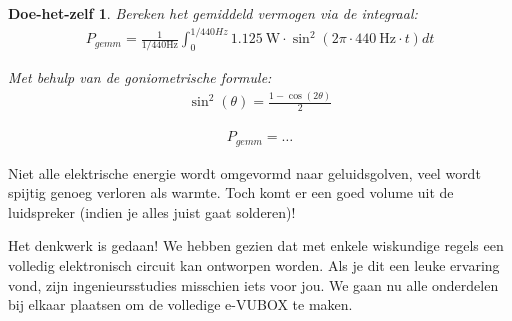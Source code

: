 \documentclass{article}
\newtheorem{DIY}{Doe-het-zelf}
\begin{document}
			\begin{DIY}
				Bereken het gemiddeld vermogen via de integraal:
				\begin{align*}
				   P_{gemm} = \frac{1}{1/440 \text{Hz}} \int_0^{1/440Hz} 1.125~\text{W} \cdot \sin^2 \left(2\pi \cdot 440~\text{Hz} \cdot t\right) dt
				\end{align*}

				Met behulp van de goniometrische formule:
				\begin{align*}
				    \sin^2(\theta) = \frac{1 - \cos(2\theta)}{2}
				 \end{align*}

				 	\begin{align*}
				 	    P_{gemm} = \ldots
				 	\end{align*}
			\end{DIY}

			Niet alle elektrische energie  wordt omgevormd naar geluidsgolven, veel wordt spijtig genoeg verloren als warmte. Toch komt er een goed volume uit de luidspreker (indien je alles juist gaat solderen)!

			Het denkwerk is gedaan! We hebben gezien dat met enkele wiskundige regels een volledig elektronisch circuit kan ontworpen worden. Als je dit een leuke ervaring vond, zijn ingenieursstudies misschien iets voor jou. We gaan nu alle onderdelen bij elkaar plaatsen om de volledige e-VUBOX te maken.
	
\end{document}

